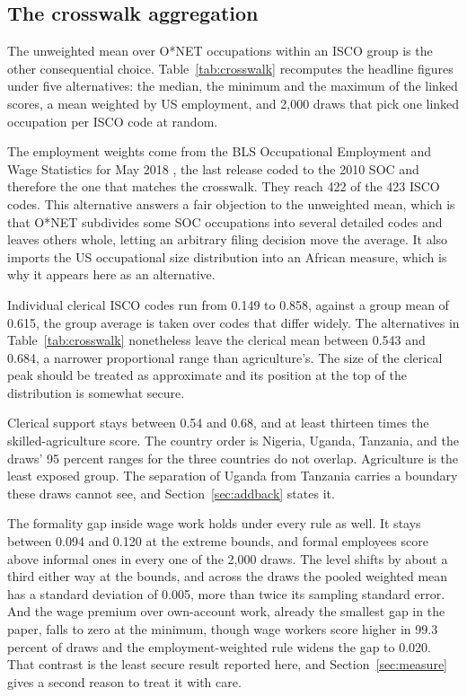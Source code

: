 \subsection{The crosswalk aggregation}
\label{sec:crosswalk}

The unweighted mean over O*NET occupations within an ISCO group is the other
consequential choice. Table~\ref{tab:crosswalk} recomputes the headline figures
under five alternatives: the median, the minimum and the maximum of the linked
scores, a mean weighted by US employment, and 2,000 draws that pick one linked
occupation per ISCO code at random.

The employment weights come from the BLS Occupational Employment and Wage
Statistics for May 2018 \citep{oews2018}, the last release coded to the 2010
SOC and therefore the one that matches the crosswalk. They reach 422 of the 423
ISCO codes. This alternative answers a fair objection to the unweighted mean,
which is that O*NET subdivides some SOC occupations into several detailed codes
and leaves others whole, letting an arbitrary filing decision move the average. It
also imports the US occupational size distribution into an African measure,
which is why it appears here as an alternative.

Individual clerical ISCO codes run from 0.149 to
0.858, against a group mean of 0.615, the group average is taken over codes
that differ widely. The alternatives in Table~\ref{tab:crosswalk} nonetheless
leave the clerical mean between 0.543 and 0.684, a narrower proportional range
than agriculture's. The size of the clerical peak should be treated as
approximate and its position at the top of the distribution is somewhat secure.

Clerical support stays between 0.54 and
0.68, and at least thirteen times the skilled-agriculture score. The country
order is Nigeria, Uganda, Tanzania, and the draws' 95 percent ranges for the
three countries do not overlap. Agriculture is the least exposed group. The
separation of Uganda from Tanzania carries a boundary these draws cannot see,
and Section~\ref{sec:addback} states it.

The formality gap inside wage work holds under every rule as well. It stays
between 0.094 and 0.120 at the extreme bounds, and formal employees score above
informal ones in every one of the 2,000 draws.
The level shifts by about a third either way at the bounds, and
across the draws the pooled weighted mean has a standard deviation of 0.005,
more than twice its sampling standard error. And the wage premium over
own-account work, already the smallest gap in the paper, falls to zero at the
minimum, though wage workers score higher in 99.3 percent of draws and the
employment-weighted rule widens the gap to 0.020. That contrast is the least
secure result reported here, and Section~\ref{sec:measure} gives a second reason
to treat it with care.

